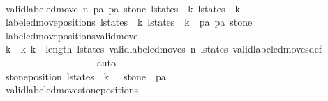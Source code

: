 \begin{isabellebody}
\ \ \ \ \ \ \ \ \ \ \ \ \ \ \ \ \isamarkupfalse%
\isanewline
\ \ \ \ \ \ \ \ \ \ \ \ \ \ \ \ \isamarkupfalse%
\ \isamarkupfalse%
\ {\isachardoublequoteopen}valid{\isacharunderscore}labeled{\isacharunderscore}move{\isacharprime}\ n\ p{}a\ p{}a\ stone\ {\isacharparenleft}l{\isacharunderscore}states\ {\isacharbang}\ k{}{\isacharparenright}\ {\isacharparenleft}l{\isacharunderscore}states\ {\isacharbang}\ {\isacharparenleft}k{}{\isacharplus}{}{\isacharparenright}{\isacharparenright}{\isachardoublequoteclose}\isanewline
\ \ \ \ \ \ \ \ \ \ \ \ \ \ \ \ \ \ \isamarkupfalse%
\ {\isacharbackquoteopen}labeled{\isacharunderscore}move{\isacharunderscore}positions\ {\isacharparenleft}l{\isacharunderscore}states\ {\isacharbang}\ k{}{\isacharparenright}\ {\isacharparenleft}l{\isacharunderscore}states\ {\isacharbang}\ {\isacharparenleft}k{}{\isacharplus}{}{\isacharparenright}{\isacharparenright}\ {\isacharequal}\ {\isacharparenleft}p{}a{\isacharcomma}\ p{}a{\isacharcomma}\ stone{\isacharparenright}{\isacharbackquoteclose}\isanewline
\ \ \ \ \ \ \ \ \ \ \ \ \ \ \ \ \ \ \isamarkupfalse%
\ labeled{\isacharunderscore}move{\isacharunderscore}positions{\isacharunderscore}valid{\isacharunderscore}move{\isacharprime}\isanewline
\ \ \ \ \ \ \ \ \ \ \ \ \ \ \ \ \ \ \isamarkupfalse%
\ {\isacartoucheopen}k{}\ {\isacharless}\ k{}{\isacartoucheclose}\ {\isacartoucheopen}k{}\ {\isacharless}\ length\ l{\isacharunderscore}states{\isacartoucheclose}\ {\isacartoucheopen}valid{\isacharunderscore}labeled{\isacharunderscore}moves\ n\ l{\isacharunderscore}states{\isacartoucheclose}\ valid{\isacharunderscore}labeled{\isacharunderscore}moves{\isacharunderscore}def\isanewline
\ \ \ \ \ \ \ \ \ \ \ \ \ \ \ \ \ \ \isamarkupfalse%
\ auto\isanewline
\ \ \ \ \ \ \ \ \ \ \ \ \ \ \ \ \isamarkupfalse%
\isanewline
\ \ \ \ \ \ \ \ \ \ \ \ \ \ \ \ \isamarkupfalse%
\ {\isachardoublequoteopen}stone{\isacharunderscore}position\ {\isacharparenleft}l{\isacharunderscore}states\ {\isacharbang}\ {\isacharparenleft}k{}\ {\isacharplus}\ {}{\isacharparenright}{\isacharparenright}\ stone\ {\isacharequal}\ p{}a{\isachardoublequoteclose}\isanewline
\ \ \ \ \ \ \ \ \ \ \ \ \ \ \ \ \ \ \isamarkupfalse%
\ valid{\isacharunderscore}labeled{\isacharunderscore}move{\isacharprime}{\isacharunderscore}stone{\isacharunderscore}positions\isanewline

\end{isabellebody}
